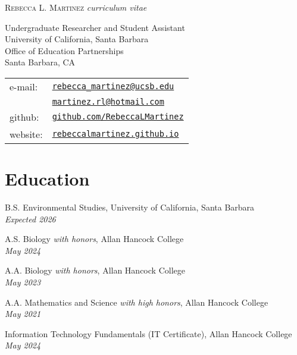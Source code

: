 \documentclass[letterpaper]{article}
\def\name{Rebecca L. Martinez}
\renewenvironment{itemize}{
  \begin{list}{}{
    \setlength{\leftmargin}{1.5em}
  }
}{
  \end{list}
}
\begin{document}
{\LARGE \scshape \name}
{\emph{curriculum vitae}}

\vspace{0.25in}

\begin{minipage}{0.55\linewidth}

Undergraduate Researcher and Student Assistant\\
University of California, Santa Barbara\\
Office of Education Partnerships\\
Santa Barbara, CA
\end{minipage}
\begin{minipage}{0.45\linewidth}
  \begin{tabular}{ll}
    e-mail: & \href{mailto:rebecca_martinez@ucsb.edu}{\tt rebecca\_martinez@ucsb.edu} \\
            & \href{mailto:martinez.rl@hotmail.com}{\tt martinez.rl@hotmail.com} \\
    github: & \href{https://github.com/RebeccaLMartinez}{\tt github.com/RebeccaLMartinez} \\
    website: & \href{https://rebeccalmartinez.github.io/personal_website/}{\tt rebeccalmartinez.github.io}
  \end{tabular}
\end{minipage}

\vspace{0.2in}

\section*{Education}

\begin{itemize}

  \item B.S. Environmental Studies, University of California, Santa Barbara \\
  \textit{Expected 2026}

  \item A.S. Biology \textit{with honors}, Allan Hancock College \\
  \textit{May 2024}

  \item A.A. Biology \textit{with honors}, Allan Hancock College \\
  \textit{May 2023}

  \item A.A. Mathematics and Science \textit{with high honors}, Allan Hancock College \\
  \textit{May 2021}

  \item Information Technology Fundamentals (IT Certificate), Allan Hancock College \\
  \textit{May 2024}

\end{itemize}
\end{document}
